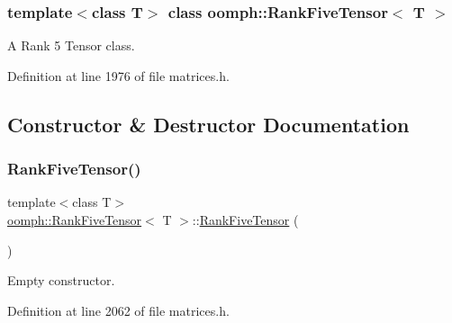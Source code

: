 \subsubsection*{template$<$class T$>$\newline
class oomph\+::\+Rank\+Five\+Tensor$<$ T $>$}

A Rank 5 Tensor class. 

Definition at line 1976 of file matrices.\+h.



\subsection{Constructor \& Destructor Documentation}
\mbox{\label{classoomph_1_1RankFiveTensor_a388a9f191189d174e521d422e3bc44cd}} 
\subsubsection{\texorpdfstring{Rank\+Five\+Tensor()}{RankFiveTensor()}\hspace{0.1cm}{\footnotesize\ttfamily [1/5]}}
{\footnotesize\ttfamily template$<$class T$>$ \\
\hyperlink{classoomph_1_1RankFiveTensor}{oomph\+::\+Rank\+Five\+Tensor}$<$ T $>$\+::\hyperlink{classoomph_1_1RankFiveTensor}{Rank\+Five\+Tensor} (\begin{DoxyParamCaption}{ }\end{DoxyParamCaption})\hspace{0.3cm}{\ttfamily [inline]}}



Empty constructor. 



Definition at line 2062 of file matrices.\+h.

\mbox{\label{classoomph_1_1RankFiveTensor_a17aa636c6c8b4aa80ff4e168bca1881b}} 
